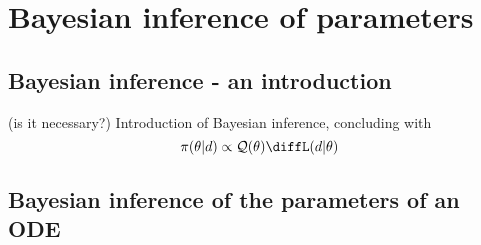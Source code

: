 \section{Bayesian inference of parameters}

\subsection{Bayesian inference - an introduction}
(is it necessary?) Introduction of Bayesian inference, concluding with
\begin{equation}\label{BayesFormula}
	\pi(\theta|d) \propto \mathcal{Q}(\theta) \diffL(d|\theta)
\end{equation}

\subsection{Bayesian inference of the parameters of an ODE}

